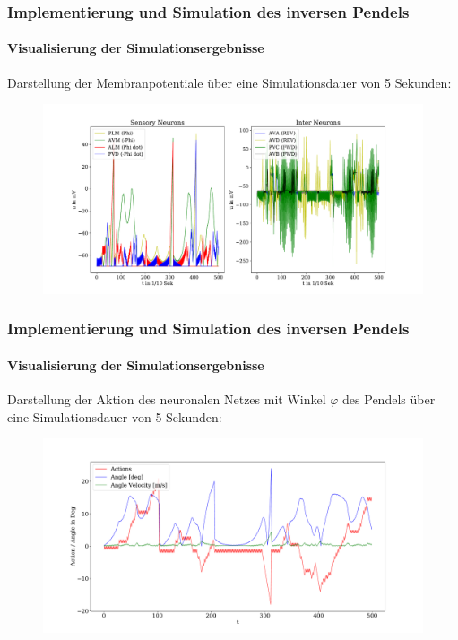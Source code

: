 \documentclass[10pt,t,aspectratio=1610]{beamer}
\newcommand{\ChapterCartpole}{Implementierung und Simulation des inversen Pendels}
\begin{document}
\begin{frame}
	\frametitle{\ChapterCartpole}
	\framesubtitle{Visualisierung der Simulationsergebnisse}
	\vspace{0.3cm}
	Darstellung der Membranpotentiale über eine Simulationsdauer von 5 Sekunden:
	\vspace{-0.2cm}
	\begin{figure}[H] %
		\centering
		\includegraphics[width=14cm]{figures/plot_membranpot_2.pdf}
		\label{fig:memb_pot}
	\end{figure}
\end{frame}


\begin{frame}
	\frametitle{\ChapterCartpole}
	\framesubtitle{Visualisierung der Simulationsergebnisse}
	\vspace{0.3cm}
	Darstellung der Aktion des neuronalen Netzes mit Winkel $\varphi$ des Pendels über eine Simulationsdauer von 5 Sekunden:
	\vspace{-0.2cm}
	\begin{figure}[H] %
		\centering
		\includegraphics[width=13cm]{figures/plot_action.pdf}
		\label{fig:action}
	\end{figure}
\end{frame}
\end{document}
